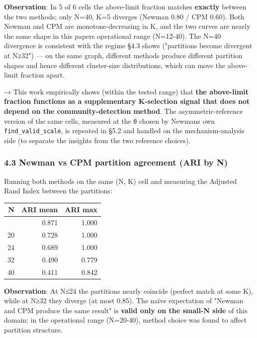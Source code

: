 \documentclass[
]{article}
\newcounter{none} %
\begin{document}
\textbf{Observation}: In 5 of 6 cells the above-limit fraction matches
\textbf{exactly} between the two methods; only N=40, K=5 diverges
(Newman 0.80 / CPM 0.60). Both Newman and CPM are monotone-decreasing in
K, and the two curves are nearly the same shape in this
paper\textquotesingle s operational range (N=12-40). The N=40 divergence
is consistent with the regime §4.3 shows ("partitions become divergent
at N≥32") --- on the same graph, different methods produce different
partition shapes and hence different cluster-size distributions, which
can move the above-limit fraction apart.

→ This work empirically shows (within the tested range) that \textbf{the
above-limit fraction functions as a supplementary K-selection signal
that does not depend on the community-detection method}. The
asymmetric-reference version of the same cells, measured at the θ chosen
by Newman\textquotesingle s own \texttt{find\_valid\_scale}, is repeated
in §5.2 and handled on the mechanism-analysis side (to separate the
insights from the two reference choices).

\subsubsection{4.3 Newman vs CPM partition agreement (ARI by
N)}\label{43-newman-vs-cpm-partition-agreement-ari-by-n}

Running both methods on the same (N, K) cell and measuring the Adjusted
Rand Index between the partitions:

{\def\LTcaptype{none} %
\begin{longtable}[]{@{}rrr@{}}
\toprule\noalign{}
N & ARI mean & ARI max \\
\midrule\noalign{}
\endhead
\bottomrule\noalign{}
\endlastfoot
12 & 0.871 & 1.000 \\
20 & 0.728 & 1.000 \\
24 & 0.689 & 1.000 \\
32 & 0.490 & 0.779 \\
40 & 0.411 & 0.842 \\
\end{longtable}
}

\textbf{Observation}: At N≤24 the partitions nearly coincide (perfect
match at some K), while at N≥32 they diverge (at most 0.85). The naïve
expectation of "Newman and CPM produce the same result" is \textbf{valid
only on the small-N side} of this domain; in the operational range
(N=20-40), method choice was found to affect partition structure.
\end{document}

